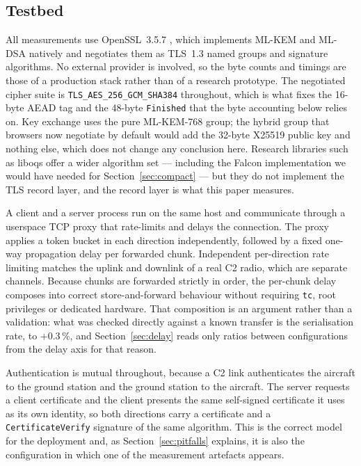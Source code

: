 \documentclass[drones,article,submit,pdftex,moreauthors]{Definitions/mdpi}
\newcommand{\mlkem}{ML-KEM}
\newcommand{\mldsa}{ML-DSA}
\newcommand{\tls}{TLS}
\begin{document}
\subsection{Testbed}

All measurements use OpenSSL~3.5.7 \cite{openssl35}, which implements
\mlkem{} and \mldsa{} natively and negotiates them as \tls{}~1.3
\cite{rfc8446} named groups and signature algorithms. No external
provider is involved, so the byte counts and timings are those of a
production stack rather than of a research prototype. The negotiated
cipher suite is \texttt{TLS\_AES\_256\_GCM\_SHA384} throughout, which is
what fixes the 16-byte AEAD tag and the 48-byte \texttt{Finished} that
the byte accounting below relies on. Key exchange uses the pure
\mlkem{}-768 group; the hybrid group that browsers now negotiate by
default would add the 32-byte X25519 public key and nothing else, which
does not change any conclusion here. Research
libraries such as liboqs \cite{liboqs} offer a wider algorithm set ---
including the Falcon implementation we would have needed for
Section~\ref{sec:compact} --- but they do not implement the \tls{}
record layer, and the record layer is what this paper measures.

A client and a server process run on the same host and communicate
through a userspace TCP proxy that rate-limits and delays the
connection. The proxy applies a token bucket in each direction
independently, followed by a fixed one-way propagation delay per
forwarded chunk. Independent per-direction rate limiting matches the
uplink and downlink of a real C2 radio, which are separate channels.
Because chunks are forwarded strictly in order, the per-chunk delay
composes into correct store-and-forward behaviour without requiring
\texttt{tc}, root privileges or dedicated hardware. That composition is
an argument rather than a validation: what was checked directly against
a known transfer is the serialisation rate, to $+0.3$\,\%, and
Section~\ref{sec:delay} reads only ratios between configurations from
the delay axis for that reason.

Authentication is mutual throughout, because a C2 link authenticates
the aircraft to the ground station and the ground station to the
aircraft. The server requests a client certificate and the client
presents the same self-signed certificate it uses as its own identity,
so both directions carry a certificate and a \texttt{CertificateVerify}
signature of the same algorithm. This is the correct model for the
deployment and, as Section~\ref{sec:pitfalls} explains, it is also the
configuration in which one of the measurement artefacts appears.
\end{document}
